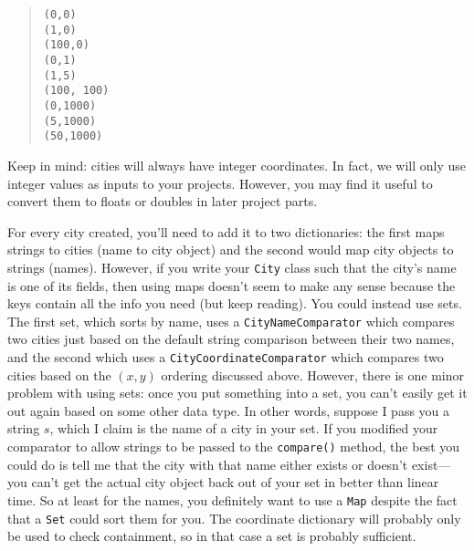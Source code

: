 \documentclass[12pt]{article}
\begin{document}
\begin{quote}
\begin{verbatim}
(0,0)
(1,0)
(100,0)
(0,1)
(1,5)
(100, 100)
(0,1000)
(5,1000)
(50,1000)
\end{verbatim}
\end{quote}


Keep in mind: cities will always have integer coordinates. In fact, we
will only use integer values as inputs to your projects. However, you
may find it useful to convert them to floats or doubles in later project parts.

For every city created, you'll need to add it to two dictionaries: the
first maps strings to cities (name to city object) and the second would
map city objects to strings (names).  However, if you write your
\texttt{City} class such that the city's name is one of its fields, then
using maps doesn't seem to make any sense because the keys contain all
the info you need (but keep reading).  You could instead use sets.
The first set, which sorts by name, uses a \texttt{CityNameComparator}
which compares two cities just based on the default string comparison
between their two names, and the second which uses a
\texttt{CityCoordinateComparator} which compares two cities based on the
$(x,y)$ ordering discussed above.  However, there is one minor problem
with using sets: once you put something into a set, you can't easily
get it out again based on some other data type.  In other words,
suppose I pass you a string $s$, which I claim is the name of a city in
your set.  If you modified your comparator to allow strings to be
passed to the \texttt{compare()} method, the best you could do is tell
me that the city with that name either exists or doesn't exist---you
can't get the actual city object back out of your set in better than
linear time.  So at least for the names, you definitely want to use a
\texttt{Map} despite the fact that a \texttt{Set} could sort them for
you.  The coordinate dictionary will probably only be used to check
containment, so in that case a set is probably sufficient.
\end{document}
